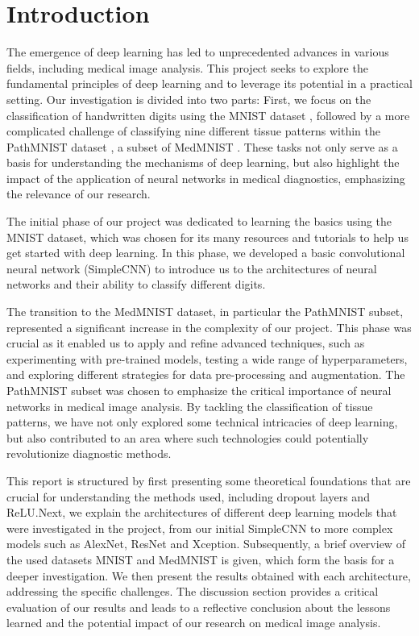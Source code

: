 \section{Introduction}\label{intro}


The emergence of deep learning has led to unprecedented advances in various fields, including medical image analysis. This project seeks to explore the fundamental principles of deep learning and to leverage its potential in a practical setting. Our investigation is divided into two parts: First, we focus on the classification of handwritten digits using the MNIST dataset \citep{mnist}, followed by a more complicated challenge of classifying nine different tissue patterns within the PathMNIST dataset \citep{kather2018, kather2019}, a subset of MedMNIST \citep{medmnistv1}. These tasks not only serve as a basis for understanding the mechanisms of deep learning, but also highlight the impact of the application of neural networks in medical diagnostics, emphasizing the relevance of our research.

The initial phase of our project was dedicated to learning the basics using the MNIST dataset, which was chosen for its many resources and tutorials to help us get started with deep learning. In this phase, we developed a basic convolutional neural network (SimpleCNN) to introduce us to the architectures of neural networks and their ability to classify different digits.

The transition to the MedMNIST dataset, in particular the PathMNIST subset, represented a significant increase in the complexity of our project. This phase was crucial as it enabled us to apply and refine advanced techniques, such as experimenting with pre-trained models, testing a wide range of hyperparameters, and exploring different strategies for data pre-processing and augmentation. The PathMNIST subset was chosen to emphasize the critical importance of neural networks in medical image analysis. By tackling the classification of tissue patterns, we have not only explored some technical intricacies of deep learning, but also contributed to an area where such technologies could potentially revolutionize diagnostic methods.

This report is structured by first presenting some theoretical foundations that are crucial for understanding the methods used, including dropout layers and ReLU.\@ Next, we explain the architectures of different deep learning models that were investigated in the project, from our initial SimpleCNN to more complex models such as AlexNet, ResNet and Xception. Subsequently, a brief overview of the used datasets MNIST and MedMNIST is given, which form the basis for a deeper investigation. We then present the results obtained with each architecture, addressing the specific challenges. The discussion section provides a critical evaluation of our results and leads to a reflective conclusion about the lessons learned and the potential impact of our research on medical image analysis.
